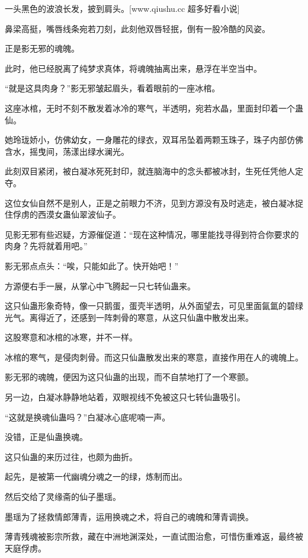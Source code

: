
\begin{this_body}

一头黑色的波浪长发，披到肩头。[www.qiushu.cc 超多好看小说]

鼻梁高挺，嘴唇线条宛若刀刻，此刻他双唇轻抿，倒有一股冷酷的风姿。

正是影无邪的魂魄。

此时，他已经脱离了纯梦求真体，将魂魄抽离出来，悬浮在半空当中。

“就是这具肉身？”影无邪皱起眉头，看着眼前的一座冰棺。

这座冰棺，无时不刻不散发着冰冷的寒气，半透明，宛若水晶，里面封印着一个蛊仙。

她玲珑娇小，仿佛幼女，一身雕花的绿衣，双耳吊坠着两颗玉珠子，珠子内部仿佛含水，摇曳间，荡漾出绿水澜光。

此刻双目紧闭，被白凝冰死死封印，就连脑海中的念头都被冰封，生死任凭他人定夺。

这位女仙自然不是别人，正是之前眼力不济，见到方源没有及时逃走，被白凝冰捉住俘虏的西漠女蛊仙翠波仙子。

见影无邪有些迟疑，方源催促道：“现在这种情况，哪里能找寻得到符合你要求的肉身？先将就着用吧。”

影无邪点点头：“唉，只能如此了。快开始吧！”

方源便右手一展，从掌心中飞腾起一只七转仙蛊来。

这只仙蛊形象奇特，像一只鹅蛋，蛋壳半透明，从外面望去，可见里面氤氲的碧绿光气。离得近了，还感到一阵刺骨的寒意，从这只仙蛊中散发出来。

这股寒意和冰棺的冰寒，并不一样。

冰棺的寒气，是侵肉刺骨。而这只仙蛊散发出来的寒意，直接作用在人的魂魄上。

影无邪的魂魄，便因为这只仙蛊的出现，而不自禁地打了一个寒颤。

另一边，白凝冰静静地站着，双眼视线不免被这只七转仙蛊吸引。

“这就是换魂仙蛊吗？”白凝冰心底呢喃一声。

没错，正是仙蛊换魂。

这只仙蛊的来历过往，也颇为曲折。

起先，是被第一代幽魂分魂之一的绿，炼制而出。

然后交给了灵缘斋的仙子墨瑶。

墨瑶为了拯救情郎薄青，运用换魂之术，将自己的魂魄和薄青调换。

薄青残魂被影宗所救，藏在中洲地渊深处，一直试图治愈，可惜伤重难返，最终被天庭俘虏。


\end{this_body}
